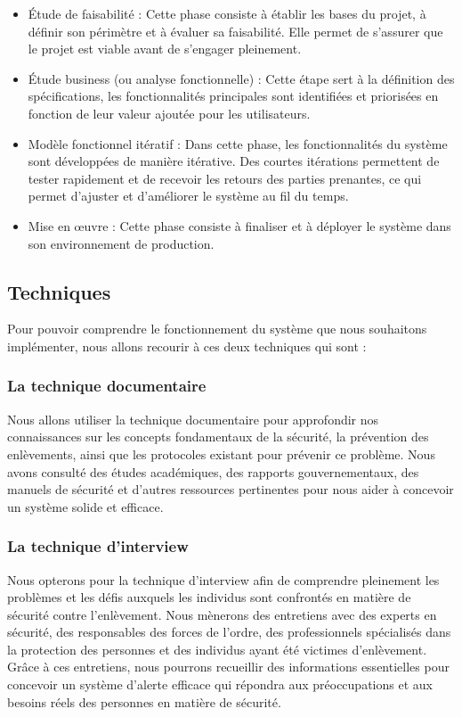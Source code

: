 \begin{itemize}
	\item Étude de faisabilité : Cette phase consiste à établir les bases du projet, à définir son périmètre et à évaluer sa faisabilité. Elle permet de s'assurer que le projet est viable avant de s'engager pleinement.
	
	\item Étude business (ou analyse fonctionnelle) : Cette étape sert à la définition des spécifications, les fonctionnalités principales sont identifiées et priorisées en fonction de leur valeur ajoutée pour les utilisateurs.
	\item Modèle fonctionnel itératif : Dans cette phase, les fonctionnalités du système sont développées de manière itérative. Des courtes itérations permettent de tester rapidement et de recevoir les retours des parties prenantes, ce qui permet d'ajuster et d'améliorer le système au fil du temps.
	
	\item Mise en œuvre : Cette phase consiste à finaliser et à déployer le système dans son environnement de production.
\end{itemize}

\subsection{Techniques}
Pour pouvoir comprendre le fonctionnement du système que nous souhaitons implémenter, nous allons recourir à ces deux techniques qui sont :

\subsubsection{La technique documentaire}
	
Nous allons utiliser la technique documentaire pour approfondir nos connaissances sur les concepts fondamentaux de la sécurité, la prévention des enlèvements, ainsi que les protocoles existant pour prévenir ce problème. Nous avons consulté des études académiques, des rapports gouvernementaux, des manuels de sécurité et d'autres ressources pertinentes pour nous aider à concevoir un système solide et efficace.
	
\subsubsection{La technique d’interview}
	
Nous opterons pour la technique d'interview afin de comprendre pleinement les problèmes et les défis auxquels les individus sont confrontés en matière de sécurité contre l'enlèvement.  Nous mènerons des entretiens avec des experts en sécurité, des responsables des forces de l'ordre, des professionnels spécialisés dans la protection des personnes et des individus ayant été victimes d'enlèvement. Grâce à ces entretiens, nous pourrons recueillir des informations essentielles pour concevoir un système d'alerte efficace qui répondra aux préoccupations et aux besoins réels des personnes en matière de sécurité.

